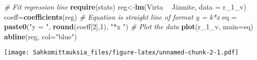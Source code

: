 \documentclass[]{article}
\makeatletter
\newenvironment{Shaded}{\begin{snugshade}}{\end{snugshade}}
\newcommand{\KeywordTok}[1]{\textcolor[rgb]{0.13,0.29,0.53}{\textbf{#1}}}
\newcommand{\DataTypeTok}[1]{\textcolor[rgb]{0.13,0.29,0.53}{#1}}
\newcommand{\DecValTok}[1]{\textcolor[rgb]{0.00,0.00,0.81}{#1}}
\newcommand{\StringTok}[1]{\textcolor[rgb]{0.31,0.60,0.02}{#1}}
\newcommand{\CommentTok}[1]{\textcolor[rgb]{0.56,0.35,0.01}{\textit{#1}}}
\newcommand{\OperatorTok}[1]{\textcolor[rgb]{0.81,0.36,0.00}{\textbf{#1}}}
\newcommand{\NormalTok}[1]{#1}
\def\maxwidth{\ifdim\Gin@nat@width>\linewidth\linewidth
\else\Gin@nat@width\fi}
\let\Oldincludegraphics\includegraphics
\renewcommand{\includegraphics}[1]{\Oldincludegraphics[width=\maxwidth]{#1}}
\makeatother
\begin{document}
\begin{Shaded}
\begin{Highlighting}[]
\CommentTok{# Fit regression line}
\KeywordTok{require}\NormalTok{(stats)}
\NormalTok{reg<-}\KeywordTok{lm}\NormalTok{(Virta }\OperatorTok{~}\StringTok{ }\NormalTok{Jännite, }\DataTypeTok{data =}\NormalTok{ r_1_v)}
\NormalTok{coeff=}\KeywordTok{coefficients}\NormalTok{(reg)}
\CommentTok{# Equation is straight line of format y = k*x}
\NormalTok{eq =}\StringTok{ }\KeywordTok{paste0}\NormalTok{(}\StringTok{"y = "}\NormalTok{, }\KeywordTok{round}\NormalTok{(coeff[}\DecValTok{2}\NormalTok{],}\DecValTok{1}\NormalTok{), }\StringTok{"*x "}\NormalTok{)}
\CommentTok{# Plot the data}
\KeywordTok{plot}\NormalTok{(r_1_v, }\DataTypeTok{main=}\NormalTok{eq)}
\KeywordTok{abline}\NormalTok{(reg, }\DataTypeTok{col=}\StringTok{"blue"}\NormalTok{)}
\end{Highlighting}
\end{Shaded}

\texttt{[image: Sahkomittauksia\_files/figure-latex/unnamed-chunk-2-1.pdf]}
\newpage 
\end{document}
